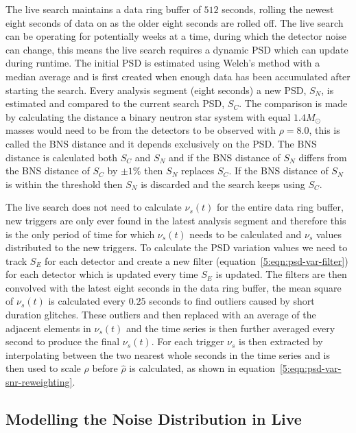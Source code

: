 
The live search maintains a data ring buffer of $512$ seconds, rolling the newest eight seconds of data on as the older eight seconds are rolled off. The live search can be operating for potentially weeks at a time, during which the detector noise can change, this means the live search requires a dynamic PSD which can update during runtime. The initial PSD is estimated using Welch's method with a median average and is first created when enough data has been accumulated after starting the search. Every analysis segment (eight seconds) a new PSD, $S_{N}$, is estimated and compared to the current search PSD, $S_{C}$. The comparison is made by calculating the distance a binary neutron star system with equal $1.4 M_{\odot}$ masses would need to be from the detectors to be observed with $\rho = 8.0$, this is called the BNS distance and it depends exclusively on the PSD. The BNS distance is calculated both $S_{C}$ and $S_{N}$ and if the BNS distance of $S_{N}$ differs from the BNS distance of $S_{C}$ by $\pm1\%$ then $S_{N}$ replaces $S_{C}$. If the BNS distance of $S_{N}$ is within the threshold then $S_{N}$ is discarded and the search keeps using $S_{C}$.

The live search does not need to calculate $\nu_{s}(t)$ for the entire data ring buffer, new triggers are only ever found in the latest analysis segment and therefore this is the only period of time for which $\nu_{s}(t)$ needs to be calculated and $\nu_{s}$ values distributed to the new triggers. To calculate the PSD variation values we need to track $S_{E}$ for each detector and create a new filter (equation~\ref{5:eqn:psd-var-filter}) for each detector which is updated every time $S_{E}$ is updated. The filters are then convolved with the latest eight seconds in the data ring buffer, the mean square of $\nu_{s}(t)$ is calculated every $0.25$ seconds to find outliers caused by short duration glitches. These outliers and then replaced with an average of the adjacent elements in $\nu_{s}(t)$ and the time series is then further averaged every second to produce the final $\nu_{s}(t)$. For each trigger $\nu_{s}$ is then extracted by interpolating between the two nearest whole seconds in the time series and is then used to scale $\rho$ before $\hat{\rho}$ is calculated, as shown in equation~\ref{5:eqn:psd-var-snr-reweighting}.

\subsection{\label{5:subsec:template-fits}Modelling the Noise Distribution in Live}

